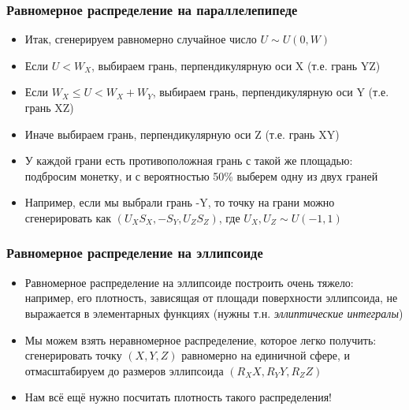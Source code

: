 \documentclass[10pt]{beamer}
\begin{document}
\begin{frame}
\frametitle{Равномерное распределение на параллелепипеде}
\begin{itemize}
\item Итак, сгенерируем равномерно случайное число \begin{math}U \sim U(0, W)\end{math}
\pause
\item Если \begin{math}U < W_X\end{math}, выбираем грань, перпендикулярную оси X (т.е. грань YZ)
\pause
\item Если \begin{math}W_X \leq U < W_X + W_Y\end{math}, выбираем грань, перпендикулярную оси Y (т.е. грань XZ)
\pause
\item Иначе выбираем грань, перпендикулярную оси Z (т.е. грань XY)
\pause
\item У каждой грани есть противоположная грань с такой же площадью: подбросим монетку, и с вероятностью 50\% выберем одну из двух граней
\pause
\item Например, если мы выбрали грань -Y, то точку на грани можно сгенерировать как \begin{math}(U_X S_X, -S_Y, U_Z S_Z)\end{math}, где \begin{math}U_X, U_Z \sim U(-1, 1)\end{math}
\end{itemize}
\end{frame}

\begin{frame}
\frametitle{Равномерное распределение на эллипсоиде}
\begin{itemize}
\item Равномерное распределение на эллипсоиде построить очень тяжело: например, его плотность, зависящая от площади поверхности эллипсоида, не выражается в элементарных функциях (нужны т.н. \textit{эллиптические интегралы})
\pause
\item Мы можем взять неравномерное распределение, которое легко получить: сгенерировать точку \begin{math}(X,Y,Z)\end{math} равномерно на единичной сфере, и отмасштабируем до размеров эллипсоида \begin{math}(R_XX,R_YY,R_ZZ)\end{math}
\pause
\item Нам всё ещё нужно посчитать плотность такого распределения!
\end{itemize}
\end{frame}
\end{document}
